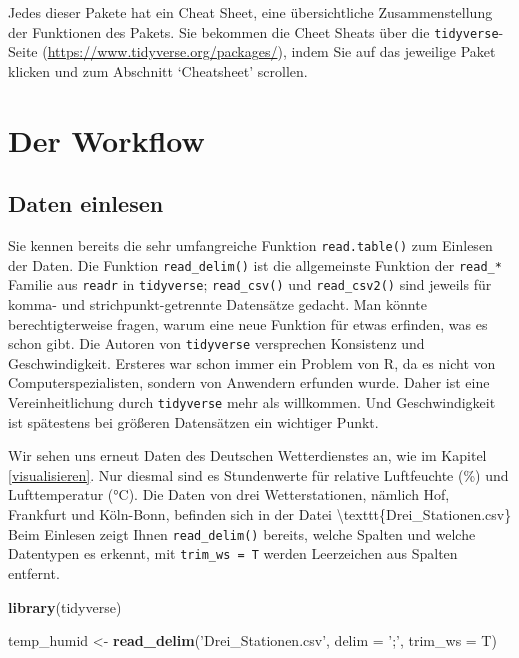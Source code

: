 \documentclass[]{book}
\newenvironment{Shaded}{\begin{snugshade}}{\end{snugshade}}
\newcommand{\DataTypeTok}[1]{\textcolor[rgb]{0.13,0.29,0.53}{#1}}
\newcommand{\KeywordTok}[1]{\textcolor[rgb]{0.13,0.29,0.53}{\textbf{#1}}}
\newcommand{\NormalTok}[1]{#1}
\newcommand{\StringTok}[1]{\textcolor[rgb]{0.31,0.60,0.02}{#1}}
\begin{document}
Jedes dieser Pakete hat ein Cheat Sheet, eine übersichtliche Zusammenstellung der Funktionen des Pakets. Sie bekommen die Cheet Sheats über die \texttt{tidyverse}-Seite (\url{https://www.tidyverse.org/packages/}), indem Sie auf das jeweilige Paket klicken und zum Abschnitt `Cheatsheet' scrollen.

\hypertarget{der-workflow}{%
\section{Der Workflow}\label{der-workflow}}

\hypertarget{daten-einlesen}{%
\subsection{Daten einlesen}\label{daten-einlesen}}

Sie kennen bereits die sehr umfangreiche Funktion \texttt{read.table()} zum Einlesen der Daten. Die Funktion \texttt{read\_delim()} ist die allgemeinste Funktion der \texttt{read\_*} Familie aus \texttt{readr} in \texttt{tidyverse}; \texttt{read\_csv()} und \texttt{read\_csv2()} sind jeweils für komma- und strichpunkt-getrennte Datensätze gedacht. Man könnte berechtigterweise fragen, warum eine neue Funktion für etwas erfinden, was es schon gibt. Die Autoren von \texttt{tidyverse} versprechen Konsistenz und Geschwindigkeit. Ersteres war schon immer ein Problem von R, da es nicht von Computerspezialisten, sondern von Anwendern erfunden wurde. Daher ist eine Vereinheitlichung durch \texttt{tidyverse} mehr als willkommen. Und Geschwindigkeit ist spätestens bei größeren Datensätzen ein wichtiger Punkt.

Wir sehen uns erneut Daten des Deutschen Wetterdienstes an, wie im Kapitel \ref{visualisieren}. Nur diesmal sind es Stundenwerte für relative Luftfeuchte (\%) und Lufttemperatur (°C). Die Daten von drei Wetterstationen, nämlich Hof, Frankfurt und Köln-Bonn, befinden sich in der Datei \textbackslash{}texttt\{Drei\_Stationen.csv\} Beim Einlesen zeigt Ihnen \texttt{read\_delim()} bereits, welche Spalten und welche Datentypen es erkennt, mit \texttt{trim\_ws\ =\ T} werden Leerzeichen aus Spalten entfernt.

\begin{Shaded}
\begin{Highlighting}[]
\KeywordTok{library}\NormalTok{(tidyverse)}

\NormalTok{temp_humid <-}\StringTok{ }\KeywordTok{read_delim}\NormalTok{(}\StringTok{'Drei_Stationen.csv'}\NormalTok{, }\DataTypeTok{delim =} \StringTok{';'}\NormalTok{,}
                         \DataTypeTok{trim_ws =}\NormalTok{ T)}
\end{Highlighting}
\end{Shaded}
\end{document}
